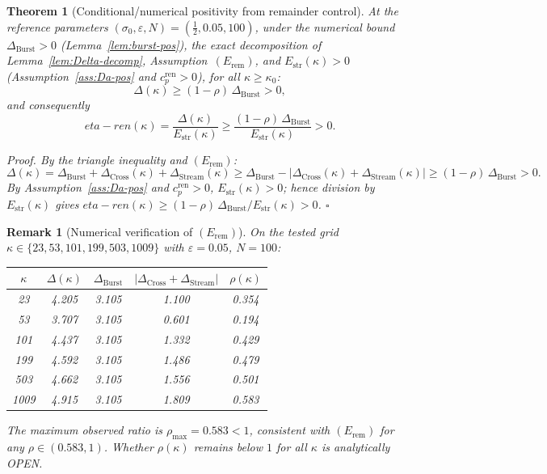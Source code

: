 \documentclass[11pt]{article}
\def\etaren{eta-ren}%
\newtheorem{theorem}{Theorem}[section]
\newtheorem*{remark}{Remark}
\newcommand{\etaren}{\eta_{\mathrm{ren}}}
\newcommand{\Dburstvar}{\Delta_{\mathrm{Burst}}}
\newcommand{\Dcross}{\Delta_{\mathrm{Cross}}}
\newcommand{\Dstream}{\Delta_{\mathrm{Stream}}}
\begin{document}
\begin{theorem}[Conditional/numerical positivity from remainder control]\label{thm:T5}
At the reference parameters
$(\sigma_0,\varepsilon,N)=(\tfrac12,0.05,100)$,
under the numerical bound $\Dburstvar>0$ (Lemma~\ref{lem:burst-pos}),
the exact decomposition of Lemma~\ref{lem:Delta-decomp},
Assumption~$(E_{\mathrm{rem}})$,
and $E_{\mathrm{str}}(\kappa)>0$
(Assumption~\ref{ass:Da-pos} and $c_p^{\mathrm{ren}}>0$),
for all $\kappa\ge\kappa_0$:
\[
\Delta(\kappa)
\ge (1-\rho)\,\Dburstvar > 0,
\]
and consequently
\[
\etaren(\kappa)
= \frac{\Delta(\kappa)}{E_{\mathrm{str}}(\kappa)}
\ge \frac{(1-\rho)\,\Dburstvar}{E_{\mathrm{str}}(\kappa)} > 0.
\]

\emph{Proof.}
By the triangle inequality and $(E_{\mathrm{rem}})$:
\[
\Delta(\kappa)
= \Dburstvar
  + \Dcross(\kappa)
  + \Dstream(\kappa)
\ge \Dburstvar
  - |\Dcross(\kappa)+\Dstream(\kappa)|
\ge (1-\rho)\,\Dburstvar > 0.
\]
By Assumption~\ref{ass:Da-pos} and $c_p^{\mathrm{ren}}>0$,
$E_{\mathrm{str}}(\kappa)>0$; hence division by $E_{\mathrm{str}}(\kappa)$ gives
$\etaren(\kappa) \ge (1-\rho)\,\Dburstvar/E_{\mathrm{str}}(\kappa) > 0$.
$\square$
\end{theorem}

\begin{remark}[Numerical verification of $(E_{\mathrm{rem}})$]
On the tested grid $\kappa\in\{23,53,101,199,503,1009\}$
with $\varepsilon=0.05$, $N=100$:
\begin{center}
\begin{tabular}{ccccc}
\toprule
$\kappa$ & $\Delta(\kappa)$ & $\Dburstvar$
& $|\Dcross+\Dstream|$ & $\rho(\kappa)$ \\
\midrule
23   & 4.205 & 3.105 & 1.100 & 0.354 \\
53   & 3.707 & 3.105 & 0.601 & 0.194 \\
101  & 4.437 & 3.105 & 1.332 & 0.429 \\
199  & 4.592 & 3.105 & 1.486 & 0.479 \\
503  & 4.662 & 3.105 & 1.556 & 0.501 \\
1009 & 4.915 & 3.105 & 1.809 & 0.583 \\
\bottomrule
\end{tabular}
\end{center}
The maximum observed ratio is $\rho_{\max}=0.583<1$,
consistent with $(E_{\mathrm{rem}})$ for any $\rho\in(0.583,1)$.
Whether $\rho(\kappa)$ remains below $1$ for all $\kappa$ is
analytically OPEN.
\end{remark}
\end{document}
